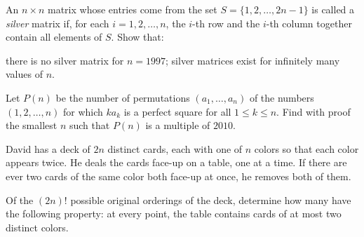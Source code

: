 
\begin{problem}
An $n \times n$ matrix whose entries come
from the set $S = \{1, 2, \dots , 2n - 1\}$
is called a \emph{silver} matrix if,
for each $i = 1, 2, \dots , n$,
the $i$-th row and the $i$-th column together
contain all elements of $S$. Show that:
\begin{enumerate}[(a)]
	\ii there is no silver matrix for $n = 1997$;
	\ii silver matrices exist for infinitely many values of $n$.
\end{enumerate}
\end{problem} 




\begin{problem}
Let $P(n)$ be the number of permutations $(a_1, \dots, a_n)$
of the numbers $(1, 2, \dots, n)$ for which $ka_k$ is a perfect square
for all $1 \leq k \leq n$.
Find with proof the smallest $n$ such that $P (n)$ is a multiple of $2010$.
\end{problem} 



\begin{problem}
David has a deck of $2n$ distinct cards,
each with one of $n$ colors so that each color appears twice.
He deals the cards face-up on a table, one at a time.
If there are ever two cards of the same color
both face-up at once, he removes both of them.

Of the $(2n)!$ possible original orderings of the deck,
determine how many have the following property:
at every point, the table contains cards of at most two distinct colors.
\end{problem} 



